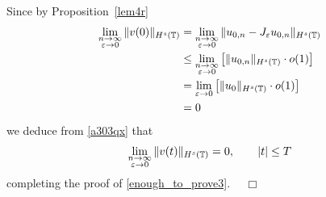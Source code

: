 Since by Proposition~\ref{lem4r} 
\begin{equation*}
\begin{split}
\lim_{\substack{n \to \infty \\ \varepsilon \to 0} }
\|v(0)\|_{H^s(\mathbb{T})}
& = \lim_{\substack{n \to \infty \\ \varepsilon \to 0} }
\|u_{0,n} - J_\varepsilon u_{0,n} \|_{H^s(\mathbb{T})} 
\\
& \le  \lim_{\substack{n \to \infty \\ \varepsilon \to 0}}
\left [ \|u_{0,n}\|_{H^s(\mathbb{T})} \cdot o(1) \right ]
\\
& = \lim_{\varepsilon \to 0} \left [ \|u_0\|_{H^s(\mathbb{T})} \cdot o(1) \right ]
\\
& = 0
\end{split}
\end{equation*}
we deduce from \eqref{a303qx} that
\begin{equation*}
\begin{split}
\lim_{\substack{n \to \infty \\ \varepsilon \to 0}} \|v(t)\|_{H^s(\mathbb{T})} = 0, \qquad |t| \le T
\end{split}
\end{equation*}
completing the proof of \eqref{enough_to_prove3}. $\quad \Box$
%
%
%
